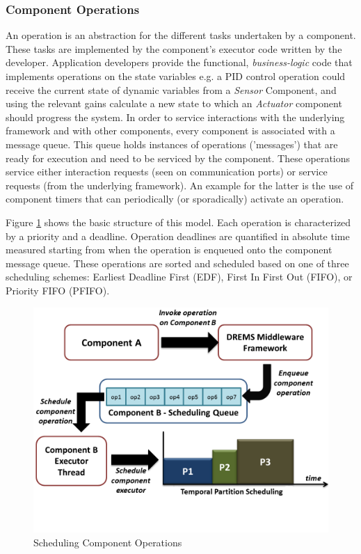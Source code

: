 \subsubsection{Component Operations}

An operation is an abstraction for the different tasks undertaken by a component. These tasks are implemented by the component's executor code written by the developer. Application developers provide the functional, \emph{business-logic} code that implements operations on the state variables e.g. a PID control operation could receive the current state of dynamic variables from a \emph{Sensor} Component, and using the relevant gains calculate a new state to which an \emph{Actuator} component should progress the system. In order to service interactions with the underlying framework and with other components, every component is associated with a message queue. This queue holds instances of operations ('messages') that are ready for execution and need to be serviced by the component. These operations service either interaction requests (seen on communication ports) or service requests (from the underlying framework). An example for the latter is the use of component timers that can periodically (or sporadically) activate an operation. 

Figure \ref{fig:component_operations} shows the basic structure of this model. Each operation is characterized by a priority and a deadline. Operation deadlines are quantified in absolute time measured starting from when the operation is enqueued onto the component message queue. These operations are sorted and scheduled based on one of three scheduling schemes: Earliest Deadline First (EDF), First In First Out (FIFO), or Priority FIFO (PFIFO). 

\begin{figure}[ht]
	\centering
	\includegraphics[width=\textwidth]{./figs/component_operations}
	\caption{Scheduling Component Operations}
	\label{fig:component_operations}
\end{figure}

